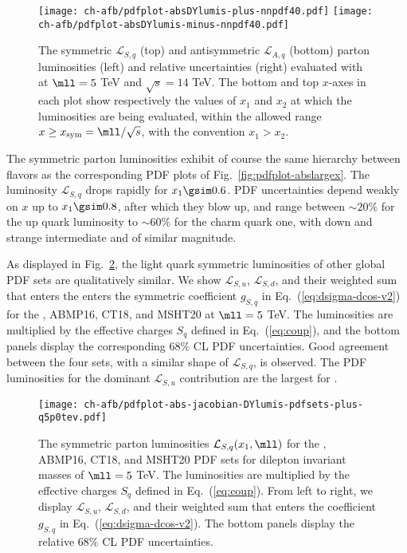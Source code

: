 \begin{figure}[!t]
 \centering
 \texttt{[image: ch-afb/pdfplot-absDYlumis-plus-nnpdf40.pdf]}
 \texttt{[image: ch-afb/pdfplot-absDYlumis-minus-nnpdf40.pdf]}
 \caption{The symmetric $\mathcal{L}_{S,q}$ (top)
   and antisymmetric $\mathcal{L}_{A,q}$ (bottom)
   parton
   luminosities (left) and relative uncertainties (right) evaluated with
    \nnlo at $\mll=5$ TeV and $\sqrt{s}=14$ TeV.
The bottom  and top $x$-axes in each plot show respectively the values
of $x_1$ and $x_2$  at which the
luminosities are being evaluated, within the allowed range
$x \ge x_{\rm sym}=\mll/\sqrt{s}$, with the convention $x_1>x_2$.}    
 \label{fig:pdfplot-absDYlumis-plus-nnpdf40}
\end{figure}

The symmetric parton luminosities exhibit of course the same hierarchy
between flavors
as the corresponding PDF plots of Fig.~\ref{fig:pdfplot-abslargex}. 
%
The luminosity $\mathcal{L}_{S,q}$  drops rapidly for
$x_1\gsim 0.6$. PDF  uncertainties  depend weakly on  $x$
up to $x_1\gsim 0.8$, after which they blow up, and range between $\sim 20\%$
for the up quark luminosity to $\sim 60\%$ for the charm quark one,
with down and strange intermediate and of similar magnitude.

As displayed in Fig.~\ref{fig:mll_dep_lumi_plus}, the light quark symmetric luminosities of other global PDF sets
are qualitatively similar.
%
We show $\mathcal{L}_{S,u}$,  $\mathcal{L}_{S,d}$,
and their weighted sum that enters the  enters the
symmetric coefficient $g_{S,q}$ in Eq.~(\ref{eq:dsigma-dcos-v2})
for the , ABMP16,
CT18, and MSHT20 at $\mll=5$ TeV.
%
The luminosities are multiplied by the effective charges
$S_q$ defined in Eq.~(\ref{eq:coup}),
and the bottom panels display the corresponding 68\% CL PDF uncertainties.
%
Good agreement between the four sets, with a similar shape
of $\mathcal{L}_{S,q}$, is observed.
%
The PDF luminosities for the dominant $\mathcal{L}_{S,u}$ contribution are the largest for .

\begin{figure}[!t]
 \centering
 \texttt{[image: ch-afb/pdfplot-abs-jacobian-DYlumis-pdfsets-plus-q5p0tev.pdf]}
  \caption{The symmetric 
   parton luminosities $\mathcal{L}_{S,q}(x_1,\mll)$ for the , ABMP16,
   CT18, and MSHT20 \nnlo PDF sets for dilepton
   invariant masses of $\mll=5$ TeV.
   The luminosities are multiplied by the effective charges
   $S_q$ defined in Eq.~(\ref{eq:coup}).
   From left to right, we display $\mathcal{L}_{S,u}$,  $\mathcal{L}_{S,d}$,
   and their weighted sum that enters the  coefficient $g_{S,q}$ in Eq.~(\ref{eq:dsigma-dcos-v2}).
   The bottom panels display the relative 68\% CL PDF uncertainties.
    }    
 \label{fig:mll_dep_lumi_plus}
\end{figure}

